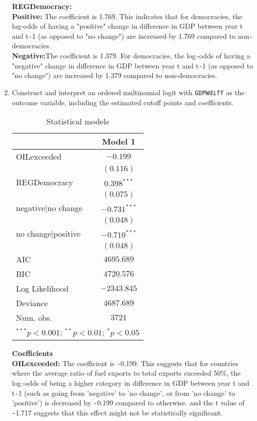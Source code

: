 \documentclass[12pt,letterpaper]{article}
\begin{document}
\begin{enumerate}
	\textbf{REGDemocracy: }\\
	\textbf{Positive:} The coefficient is 1.769. This indicates that for democracies, the log-odds of having a "positive" change in  difference in GDP between year t and t\texttt{-}1 (as opposed to "no change") are increased by 1.769 compared to non\texttt{-}democracies.\\
	\textbf{Negative:}The coefficient is 1.379. For democracies, the log\texttt{-}odds of having a "negative" change in difference in GDP between year t and t\texttt{-}1 (as opposed to "no change") are increased by 1.379 compared to non-democracies.\\
	\item Construct and interpret an ordered multinomial logit with \texttt{GDPWdiff} as the outcome variable, including the estimated cutoff points and coefficients.
	
	\newpage
	\begin{table}\begin{center}\begin{tabular}{l c}
				\hline & Model 1 \\
				\hline
				OILexceeded        & $-0.199$       \\                   & $(0.116)$      \\REGDemocracy       & $0.398^{***}$  \\                   & $(0.075)$      \\negative|no change & $-0.731^{***}$ \\                   & $(0.048)$      \\no change|positive & $-0.710^{***}$ \\                   & $(0.048)$      \\
				\hline
				AIC                & $4695.689$     \\BIC                & $4720.576$     \\Log Likelihood     & $-2343.845$    \\Deviance           & $4687.689$     \\Num. obs.          & $3721$         \\
				\hline\multicolumn{2}{l}{\scriptsize{$^{***}p<0.001$; $^{**}p<0.01$; $^{*}p<0.05$}}\end{tabular}\caption{Statistical models}\label{table:coefficients}\end{center}\end{table}
	\noindent \textbf{Coefficients}\\
	\textbf{OILexceeded: }The coefficient is \texttt{-}0.199. This suggests that for countries where the average ratio of fuel exports to total exports exceeded 50\%, the log\texttt{-}odds of being a higher category in difference in GDP between year t and t\texttt{-}1 (such as going from 'negative' to 'no change', or from 'no change' to 'positive') is decreased by \texttt{-}0.199 compared to otherwise. and the t value of \texttt{-}1.717 suggests that this effect might not be statistically significant.\\

\end{enumerate}
\end{document}
